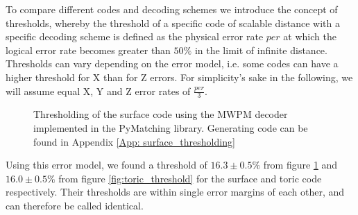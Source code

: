 To compare different codes and decoding schemes
we introduce the concept of thresholds, whereby the threshold
of a specific code of scalable distance with a specific decoding 
scheme is defined as the physical error rate $per$ at which the logical
error rate becomes greater than $50\%$ in the limit of infinite 
distance. \\
Thresholds can vary depending on the error model, i.e. 
some codes can have a higher threshold for X than for Z errors.
For simplicity's sake in the following, we will assume equal 
X, Y and Z error rates of $\frac{per}{3}$.

\begin{figure}[h!]
    \centering
    \hfill
    \caption{Thresholding of the surface code using the MWPM decoder implemented in the PyMatching \cite{MWPMDecoder} library.
    Generating code can be found in Appendix \ref{App: surface_thresholding}}
    \label{fig:surface_threshold}
  \end{figure}

Using this error model, we found a threshold of $16.3\pm 0.5 \%$ from
figure \ref{fig:surface_threshold} and $16.0\pm 0.5\%$ from figure
\ref{fig:toric_threshold} for the surface and toric code respectively. 
Their thresholds are within single error margins of each other, and 
can therefore be called identical.

